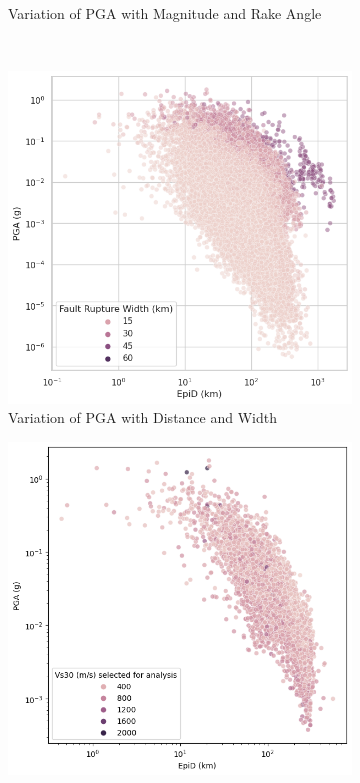\documentclass[a4paper,10pt]{article}
\begin{document}
\begin{figure}[h]
\begin{subfigure}[b]{0.45\textwidth}
         \caption{Variation of PGA with Magnitude and Rake Angle}
     \end{subfigure} \\
     \begin{subfigure}[b]{0.45\textwidth}
         \centering
         \includegraphics[width=\textwidth]{PGA_distance_Width}
         \caption{Variation of PGA with Distance and Width}
     \end{subfigure}
     \hfill
     \begin{subfigure}[b]{0.45\textwidth}
         \centering
         \includegraphics[width=\textwidth]{PGA_Mag_Width}

\end{subfigure}
\end{figure}
\end{document}
